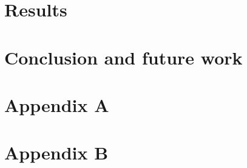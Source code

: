 \documentclass[12pt]{report} %
\begin{document}
\chapter{Results}


\chapter{Conclusion and future work}






\clearpage
{}

\printbibliography




%

\chapter* {Appendix A}

\chapter* {Appendix B}
\end{document}
